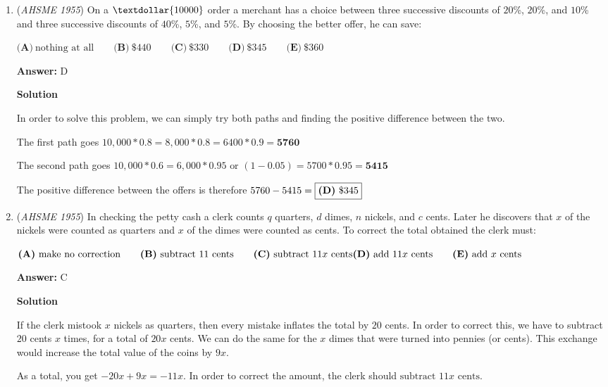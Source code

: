 \begin{enumerate}
	\item (\textit{AHSME 1955}) On a $\textdollar{10000}$ order a merchant has a choice between three successive discounts of $20$\%, $20$\%, and $10$\% and 
three successive discounts of $40$\%, $5$\%, and $5$\%. By choosing the better offer, he can save: 


 $\textbf{(A)}\ \text{nothing at all}\qquad\textbf{(B)}\ \$440\qquad\textbf{(C)}\ \$330\qquad\textbf{(D)}\ \$345\qquad\textbf{(E)}\ \$360$

 \textbf{Answer: }D



\textbf{Solution}

In order to solve this problem, we can simply try both paths and finding the positive difference between the two.

 The first path goes $10,000 * 0.8 = 8,000 * 0.8 = 6400 * 0.9 = \textbf{5760}$

 The second path goes $10,000 * 0.6 = 6,000 * 0.95 \text{ or } (1 - 0.05) = 5700 * 0.95 = \textbf{5415}$

 The positive difference between the offers is therefore $5760 - 5415 = \fbox{\textbf{(D)} \textdollar{345}}$



	\item (\textit{AHSME 1955}) In checking the petty cash a clerk counts $q$ quarters, $d$ dimes, $n$ nickels, and $c$ cents. 
Later he discovers that $x$ of the nickels were counted as quarters and $x$ of the dimes were counted as cents. 
To correct the total obtained the clerk must: 


 $\textbf{(A)}\ \text{make no correction}\qquad\textbf{(B)}\ \text{subtract 11 cents}\qquad\textbf{(C)}\ \text{subtract 11}x\text{ cents}\\ \textbf{(D)}\ \text{add 11}x\text{ cents}\qquad\textbf{(E)}\ \text{add }x\text{ cents}$

 \textbf{Answer: }C



\textbf{Solution}

If the clerk mistook $x$ nickels as quarters, then every mistake inflates the total by $20$ cents. In order to correct this, we have to subtract $20$ cents $x$ times, for a total of $20x$ cents. We can do the same for the $x$ dimes that were turned into pennies (or cents). This exchange would increase the total value of the coins by $9x$.

 As a total, you get $-20x + 9x = -11x$. In order to correct the amount, the clerk should $\boxed{\text{subtract } 11x \text{ cents}}$.


\end{enumerate}
